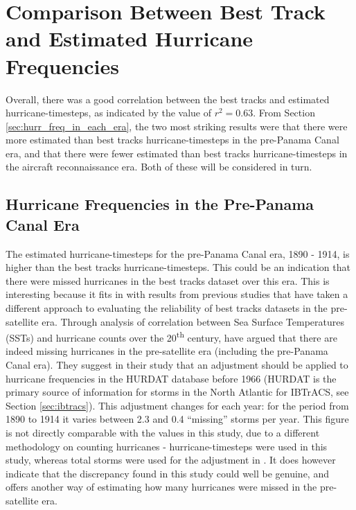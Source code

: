 \documentclass[pdftex,12pt,a4paper]{report}
\newcommand{\ts}{\textsuperscript}
\begin{document}
\section{Comparison Between Best Track and Estimated Hurricane Frequencies}
\label{sec:freq_comparison}

Overall, there was a good correlation between the best tracks and estimated hurricane-timesteps, as
indicated by the value of $r^2 = 0.63$. From Section \ref{sec:hurr_freq_in_each_era}, the two most
striking results were that there were more estimated than best tracks hurricane-timesteps in the
pre-Panama Canal era, and that there were fewer estimated than best tracks hurricane-timesteps in
the aircraft reconnaissance era. Both of these will be considered in turn.

\subsection{Hurricane Frequencies in the Pre-Panama Canal Era}
The estimated hurricane-timesteps for the pre-Panama Canal era, 1890 - 1914, is higher than the best
tracks hurricane-timesteps. This could be an indication that there were missed hurricanes in the
best tracks dataset over this era. This is interesting because it fits in with results from previous
studies that have taken a different approach to evaluating the reliability of best tracks datasets
in the pre-satellite era. Through analysis of correlation between Sea Surface Temperatures (SSTs)
and hurricane counts over the 20\ts{th} century, \textcite{vecchi2008estimates} have argued that
there are indeed missing hurricanes in the pre-satellite era (including the pre-Panama Canal era).
They suggest in their study that an adjustment should be applied to hurricane frequencies in
the HURDAT database before 1966 (HURDAT is the primary source of information for storms in the North
Atlantic for IBTrACS, see Section \ref{sec:ibtracs}). This adjustment changes for each year: for
the period from 1890 to 1914 it varies between 2.3 and 0.4 ``missing'' storms per year. This figure
is not directly comparable with the values in this study, due to a different methodology on counting
hurricanes - hurricane-timesteps were used in this study, whereas total storms were used for the
adjustment in \textcite{vecchi2008estimates}. It does however indicate that the discrepancy found in
this study could well be genuine, and offers another way of estimating how many hurricanes were
missed in the pre-satellite era.
\end{document}
